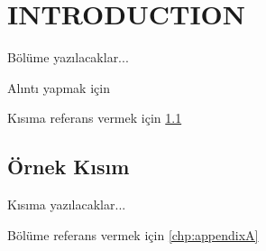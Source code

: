 \chapter{INTRODUCTION}
\label{chp:b1}

Bölüme yazılacaklar...

Alıntı yapmak için \cite{EuropeanCommission2008}

Kısıma referans vermek için \ref{sec:k1}

\section{Örnek Kısım}
\label{sec:k1}

Kısıma yazılacaklar...

Bölüme referans vermek için \ref{chp:appendixA}